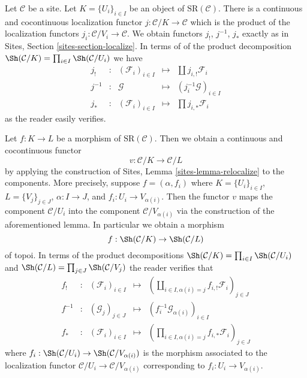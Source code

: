 \medskip\noindent
Let $\mathcal{C}$ be a site. Let $K = \{U_i\}_{i \in I}$ be an object of
$\text{SR}(\mathcal{C})$. There is a continuous and cocontinuous
localization functor $j : \mathcal{C}/K \to \mathcal{C}$ which is
the product of the localization functors
$j_i : \mathcal{C}/V_i \to \mathcal{C}$.
We obtain functors $j_!$, $j^{-1}$, $j_*$ exactly
as in Sites, Section \ref{sites-section-localize}.
In terms of of the product decomposition
$\Sh(\mathcal{C}/K) = \prod\nolimits_{i \in I} \Sh(\mathcal{C}/U_i)$
we have
$$
\begin{matrix}
j_! & : &
(\mathcal{F}_i)_{i \in I} &
\longmapsto &
\coprod j_{i, !}\mathcal{F}_i \\
j^{-1} & : &
\mathcal{G} &
\longmapsto &
(j_i^{-1}\mathcal{G})_{i \in I} \\
j_* & : &
(\mathcal{F}_i)_{i \in I} &
\longmapsto &
\prod j_{i, *}\mathcal{F}_i
\end{matrix}
$$
as the reader easily verifies.

\medskip\noindent
Let $f : K \to L$ be a morphism of $\text{SR}(\mathcal{C})$.
Then we obtain a continuous and cocontinuous functor
$$
v : \mathcal{C}/K \longrightarrow \mathcal{C}/L
$$
by applying the construction of Sites, Lemma \ref{sites-lemma-relocalize}
to the components. More precisely, suppose $f = (\alpha, f_i)$
where $K = \{U_i\}_{i \in I}$, $L = \{V_j\}_{j \in J}$, $\alpha : I \to J$,
and $f_i : U_i \to V_{\alpha(i)}$. Then the functor $v$ maps the component
$\mathcal{C}/U_i$ into the component $\mathcal{C}/V_{\alpha(i)}$
via the construction of the aforementioned lemma. In particular
we obtain a morphism
$$
f : \Sh(\mathcal{C}/K) \to \Sh(\mathcal{C}/L)
$$
of topoi. In terms of the product decompositions
$\Sh(\mathcal{C}/K) = \prod\nolimits_{i \in I} \Sh(\mathcal{C}/U_i)$ and
$\Sh(\mathcal{C}/L) = \prod\nolimits_{j \in J} \Sh(\mathcal{C}/V_j)$
the reader verifies that
$$
\begin{matrix}
f_! & : &
(\mathcal{F}_i)_{i \in I} &
\longmapsto &
(\coprod\nolimits_{i \in I, \alpha(i) = j} f_{i, !}\mathcal{F}_i)_{j \in J} \\
f^{-1} & : &
(\mathcal{G}_j)_{j \in J} &
\longmapsto &
(f_i^{-1}\mathcal{G}_{\alpha(i)})_{i \in I} \\
f_* & : &
(\mathcal{F}_i)_{i \in I} &
\longmapsto &
(\prod\nolimits_{i \in I, \alpha(i) = j} f_{i, *}\mathcal{F}_i)_{j \in J}
\end{matrix}
$$
where $f_i : \Sh(\mathcal{C}/U_i) \to \Sh(\mathcal{C}/V_{\alpha(i)})$
is the morphism associated to the localization functor
$\mathcal{C}/U_i \to \mathcal{C}/V_{\alpha(i)}$ corresponding to
$f_i : U_i \to V_{\alpha(i)}$.

